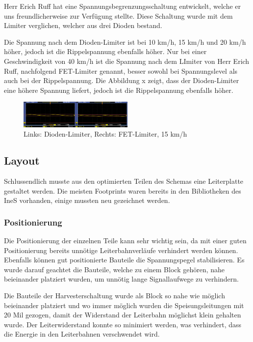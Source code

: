 Herr Erich Ruff hat eine Spannungsbegrenzungsschaltung entwickelt, welche er uns freundlicherweise zur Verfügung stellte. Diese Schaltung wurde mit dem Limiter verglichen, welcher aus drei Dioden bestand.

Die Spannung nach dem Dioden-Limiter ist bei 10 km/h, 15 km/h und 20 km/h höher, jedoch ist die Rippelspannung ebenfalls höher. Nur bei einer Geschwindigkeit von 40 km/h ist die Spannung nach dem LImiter von Herr Erich Ruff, nachfolgend FET-Limiter genannt, besser sowohl bei Spannungslevel als auch bei der Rippelspannung. Die Abbildung x zeigt, dass der Dioden-Limiter eine höhere Spannung liefert, jedoch ist die Rippelspannung ebenfalls höher.

\begin{figure}[ht]
    \includegraphics[width=0.5\textwidth]{3Vorgehen/imag/Messung_Optimierung_Limiter.png}
    \caption{Links: Dioden-Limiter, Rechts: FET-Limiter, 15 km/h}\label{messung_optimierung_limiter} 
\end{figure}

\subsection{Layout}

Schlussendlich musste aus den optimierten Teilen des Schemas eine Leiterplatte gestaltet werden. Die meisten Footprints waren bereits in den Bibliotheken des IneS vorhanden, einige mussten neu gezeichnet werden.

\subsubsection{Positionierung}

Die Positionierung der einzelnen Teile kann sehr wichtig sein, da mit einer guten Positionierung bereits unnötige Leiterbahnverläufe verhindert werden können. Ebenfalls können gut positionierte Bauteile die Spannungspegel stabilisieren. Es wurde darauf geachtet die Bauteile, welche zu einem Block gehören, nahe beieinander platziert wurden, um unnötig lange Signallaufwege zu verhindern.

Die Bauteile der Harvesterschaltung wurde als Block so nahe wie möglich beieinander platziert und wo immer möglich wurden die Speisungsleitungen mit 20 Mil gezogen, damit der Widerstand der Leiterbahn möglichst klein gehalten wurde. Der Leiterwiderstand konnte so minimiert werden, was verhindert, dass die Energie in den Leiterbahnen verschwendet wird.

